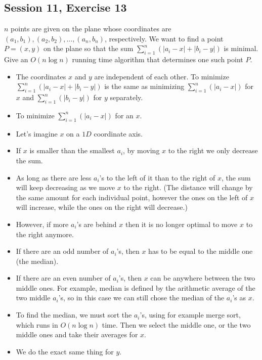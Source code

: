 \subsection {Session 11, Exercise 13}


$n$ points are given on the plane whose coordinates are $(a_1, b_1), (a_2, b_2), \dots{} ,(a_n, b_n)$, respectively. We want to find a point $P = (x,y)$ on the plane so that the sum $\sum\limits_{i=1}^{n}(|a_i - x| + |b_i - y|)$ is minimal. Give an $O(n\log{}n)$ running time algorithm that determines one such point $P$.


\begin{itemize}
\item The coordinates $x$ and $y$ are independent of each other. To minimize $\sum\limits_{i=1}^{n}(|a_i - x| + |b_i - y|)$ is the same as minimizing $\sum\limits_{i=1}^{n}(|a_i - x|)$ for $x$ and $\sum\limits_{i=1}^{n}(|b_i - y|)$ for $y$ separately.
\item To minimize $\sum\limits_{i=1}^{n}(|a_i - x|)$ for an $x$.
\item Let's imagine $x$ on a $1D$ coordinate axis.
\item If $x$ is smaller than the smallest $a_i$, by moving $x$ to the right we only decrease the sum.
\item As long as there are less $a_i$'s to the left of it than to the right of $x$, the sum will keep decreasing as we move $x$ to the right. (The distance will change by the same amount for each individual point, however the ones on the left of $x$ will increase, while the ones on the right will decrease.)
\item However, if more $a_i$'s are behind $x$ then it is no longer optimal to move $x$ to the right anymore.
\item If there are an odd number of $a_i$'s, then $x$ has to be equal to the middle one (the median).
\item If there are an even number of $a_i$'s, then $x$ can be anywhere between the two middle ones. For example, median is defined by the arithmetic average of the two middle $a_i$'s, so in this case we can still chose the median of the $a_i$'s as $x$.
\item To find the median, we must sort the $a_i$'s, using for example merge sort, which runs in $O(n\log{}n)$ time. Then we select the middle one, or the two middle ones and take their averages for $x$.
\item We do the exact same thing for $y$.
\end{itemize}